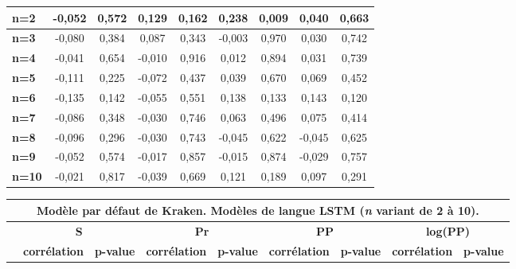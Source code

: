 \documentclass[10pt,twoside]{article}
\begin{document}
\begin{table}
\begin{center}
\begin{scriptsize}
\begin{tabular}{|l|c|c|c|c|c|c|c|c|}
    \textbf{n=2}  & -0,052 & 0,572 & 0,129  & 0,162 & 0,238  & \textbf{0,009} & 0,040  & 0,663 \\ \hline
    \textbf{n=3}  & -0,080 & 0,384 & 0,087  & 0,343 & -0,003 & 0,970          & 0,030  & 0,742 \\ \hline
    \textbf{n=4}  & -0,041 & 0,654 & -0,010 & 0,916 & 0,012  & 0,894          & 0,031  & 0,739 \\ \hline
    \textbf{n=5}  & -0,111 & 0,225 & -0,072 & 0,437 & 0,039  & 0,670          & 0,069  & 0,452 \\ \hline
    \textbf{n=6}  & -0,135 & 0,142 & -0,055 & 0,551 & 0,138  & 0,133          & 0,143  & 0,120 \\ \hline
    \textbf{n=7}  & -0,086 & 0,348 & -0,030 & 0,746 & 0,063  & 0,496          & 0,075  & 0,414 \\ \hline
    \textbf{n=8}  & -0,096 & 0,296 & -0,030 & 0,743 & -0,045 & 0,622          & -0,045 & 0,625 \\ \hline
    \textbf{n=9}  & -0,052 & 0,574 & -0,017 & 0,857 & -0,015 & 0,874          & -0,029 & 0,757 \\ \hline
    \textbf{n=10} & -0,021 & 0,817 & -0,039 & 0,669 & 0,121  & 0,189          & 0,097  & 0,291 \\ \hline

    
    \end{tabular}
    \begin{tabular}{|l|c|c|c|c|c|c|c|c|}

    \multicolumn{9}{c}{{\footnotesize Modèle par défaut de Kraken. Modèles de langue LSTM (\textit{n} variant de 2 à 10).}}\\\hline
    \multirow{2}{*}{\textbf{}} & \multicolumn{2}{c|}{\textbf{S}}         & \multicolumn{2}{c|}{\textbf{Pr}}        & \multicolumn{2}{c|}{\textbf{PP}}        & \multicolumn{2}{c|}{\textbf{log(PP)}}   \\ 
    \cline{2-9} & \textbf{corrélation} & \textbf{p-value} & \textbf{corrélation} & \textbf{p-value} & \textbf{corrélation} & \textbf{p-value} & \textbf{corrélation} & \textbf{p-value} \\ \hline


\end{tabular}
\end{scriptsize}
\end{center}
\end{table}
\end{document}
